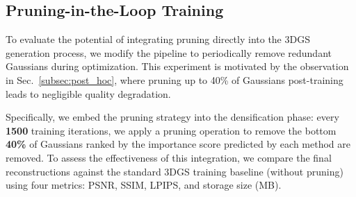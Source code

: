 \subsection{Pruning-in-the-Loop Training}
\label{sec:exp2_rec_pruning}
To evaluate the potential of integrating pruning directly into the 3DGS generation process, we modify the pipeline to periodically remove redundant Gaussians during optimization. This experiment is motivated by the observation in Sec.~\ref{subsec:post_hoc}, where pruning up to 40\% of Gaussians post-training leads to negligible quality degradation.

Specifically, we embed the pruning strategy into the densification phase: every \textbf{1500} training iterations, we apply a pruning operation to remove the bottom \textbf{40\%} of Gaussians ranked by the importance score predicted by each method are removed. To assess the effectiveness of this integration, we compare the final reconstructions against the standard 3DGS training baseline (without pruning) using four metrics: PSNR, SSIM, LPIPS, and storage size (MB).

